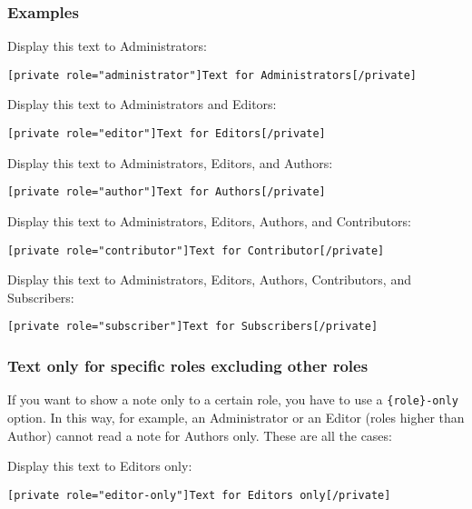 \documentclass[a4paper,10pt]{article}
\begin{document}
\subsubsection{Examples}

Display this text to Administrators:

\begin{lstlisting}
[private role="administrator"]Text for Administrators[/private]
\end{lstlisting}

Display this text to Administrators and Editors:

\begin{lstlisting}
[private role="editor"]Text for Editors[/private]
\end{lstlisting}

Display this text to Administrators, Editors, and Authors:

\begin{lstlisting}
[private role="author"]Text for Authors[/private]
\end{lstlisting}

Display this text to Administrators, Editors, Authors, and Contributors:

\begin{lstlisting}
[private role="contributor"]Text for Contributor[/private]
\end{lstlisting}

Display this text to Administrators, Editors, Authors, Contributors, and Subscribers:

\begin{lstlisting}
[private role="subscriber"]Text for Subscribers[/private]
\end{lstlisting}

\subsubsection{Text only for specific roles excluding other roles}

If you want to show a note only to a certain role, you have to use a \verb+{role}-only+ option. In this way, for example, an Administrator or an Editor (roles higher than Author) cannot read a note for Authors only. These are all the cases: \newline

Display this text to Editors only:

\begin{lstlisting}
[private role="editor-only"]Text for Editors only[/private]
\end{lstlisting}
\end{document}
